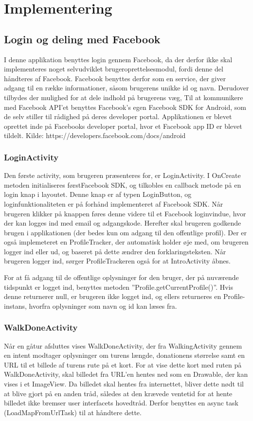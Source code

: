 \thispagestyle{fancy}
\chapter{Implementering}
\label{chp:Implementering}

\section{Login og deling med Facebook}
I denne applikation benyttes login gennem Facebook, da der derfor ikke skal implementeres noget selvudviklet brugeroprettelsesmodul, fordi denne del håndteres af Facebook. Facebook benyttes derfor som en service, der giver adgang til en række informationer, såsom brugerens unikke id og navn. Derudover tilbydes der mulighed for at dele indhold på brugerens væg, Til at kommunikere med Facebook API’et benyttes Facebook’s egen Facebook SDK for Android, som de selv stiller til rådighed på deres developer portal. Applikationen er blevet oprettet inde på Facebooks developer portal, hvor et Facebook app ID er blevet tildelt. 
Kilde: https://developers.facebook.com/docs/android

\subsection{LoginActivity}
Den første activity, som brugeren præsenteres for, er LoginActivity. I OnCreate metoden initialiseres førstFacebook SDK, og tilkobles en callback metode på en login knap i layoutet. Denne knap er af typen LoginButton, og loginfunktionaliteten er på forhånd implementeret af Facebook SDK. Når brugeren klikker på knappen føres denne videre til et Facebook loginvindue, hvor der kan logges ind med email og adgangskode. Herefter skal brugeren godkende brugen i applikationen (der bedes kun om adgang til den offentlige profil). Der er også implemeteret en ProfileTracker, der automatisk holder øje med, om brugeren logger ind eller ud, og baseret på dette ændrer den forklaringsteksten. Når brugeren logger ind, sørger ProfileTrackeren også for at IntroActivity åbnes.

For at få adgang til de offentlige oplysninger for den bruger, der på nuværende tidspunkt er logget ind, benyttes metoden ”Profile.getCurrentProfile()”. Hvis denne returnerer null, er brugeren ikke logget ind, og ellers returneres en Profile-instans, hvorfra oplysninger som navn og id kan læses fra.


\subsection{WalkDoneActivity}
Når en gåtur afsluttes vises WalkDoneActivity, der fra WalkingActivity gennem en intent modtager oplysninger om turens længde, donationens størrelse samt en URL til et billede af turens rute på et kort. For at vise dette kort med ruten på WalkDoneActivity, skal billedet fra URL’en hentes ned som en Drawable, der kan vises i et ImageView. Da billedet skal hentes fra internettet, bliver dette nødt til at blive gjort på en anden tråd, således at den krævede ventetid for at hente billedet ikke bremser user interfacets hovedtråd. Derfor benyttes en async task (LoadMapFromUrlTask) til at håndtere dette.

